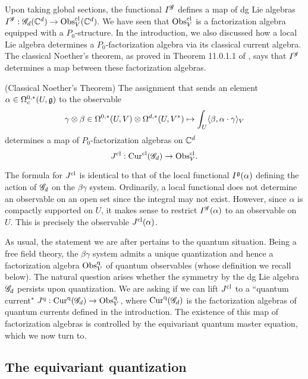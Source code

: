 Upon taking global sections, the functional $I^{\mathscr G}$ defines a map of dg Lie algebras $I^{\mathscr G} : \mathscr G_d(\mathbb C^d) \to {\rm Obs}^{{\rm cl}}_V(\mathbb C^d)$.
We have seen that ${\rm Obs}_V^{{\rm cl}}$ is a factorization algebra equipped with a $P_0$-structure. 
In the introduction, we also discussed how a local Lie algebra determines a $P_0$-factorization algebra via its classical current algebra. 
The classical Noether's theorem, as proved in Theorem 11.0.1.1 of \cite{CG2}, says that $I^{\mathscr G}$ determines a map between these factorization algebras. 

\begin{prop}[\cite{CG2}](Classical Noether's Theorem)
The assignment that sends an element $\alpha \in \Omega^{0,*}_c(U, \mathfrak g)$ to the observable
\[
\gamma \otimes \beta \in \Omega^{0,*}(U, V) \otimes \Omega^{d,*}(U, V^*) \mapsto \int_U \langle\beta, \alpha \cdot \gamma\rangle_V
\]
determines a map of $P_0$-factorization algebras on $\mathbb C^d$
\[
J^{{\rm cl}} : {\rm Cur}^{{\rm cl}} (\mathscr G_d) \to {\rm Obs}^{{\rm cl}}_V .
\]
\end{prop}

\begin{rmk}
The formula for $J^{{\rm cl}}$ is identical to that of the local functional $I^\mathfrak g(\alpha)$ defining the action of $\mathscr G_d$ on the $\beta\gamma$ system.
Ordinarily, a local functional does not determine an observable on an open set since the integral may not exist.
However, since $\alpha$ is compactly supported on $U$, it makes sense to restrict $I^\mathscr G (\alpha)$ to an observable on $U$. 
This is precisely the observable $J^{{\rm cl}}(\alpha)$. 
\end{rmk}

As usual, the statement we are after pertains to the quantum situation. 
Being a free field theory, the $\beta\gamma$ system admits a unique quantization and hence a factorization algebra ${\rm Obs}^{{\rm q}}_V$ of quantum observables (whose definition we recall below). 
The natural question arises whether the symmetry by the dg Lie algebra $\mathscr G_d$ persists upon quantization. 
We are asking if we can lift $J^{{\rm cl}}$ to a ``quantum current" $J^{{\rm q}} : {\rm Cur}^{\rm q}(\mathscr G_d) \to {\rm Obs}^{\rm q}_V$, where ${\rm Cur}^{\rm q}(\mathscr G_d)$ is the factorization algebras of quantum currents defined in the introduction. 
The existence of this map of factorization algebras is controlled by the equivariant quantum master equation, which we now turn to.

\subsection{The equivariant quantization}

